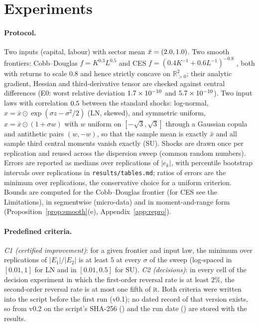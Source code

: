 \documentclass[10pt,a4paper]{article}
\theoremstyle{plain}
\theoremstyle{definition}
\theoremstyle{remark}
\newcommand{\R}{\mathbb{R}}
\begin{document}
\section{Experiments}\label{sec:exp}

\paragraph{Protocol.} Two inputs (capital, labour) with sector mean $\bar x=(2.0,1.0)$. Two smooth frontiers: Cobb--Douglas $f=K^{0.3}L^{0.5}$ \citep{cobbdouglas1928} and CES $f=(0.4K^{-1}+0.6L^{-1})^{-0.8}$ \citep{acms1961}, both with returns to scale $0.8$ and hence strictly concave on $\R^2_{>0}$; their analytic gradient, Hessian and third-derivative tensor are checked against central differences (E0: worst relative deviation $1.7\times 10^{-10}$ and $5.7\times 10^{-10}$). Two input laws with correlation $0.5$ between the standard shocks: log-normal, $x=\bar x\odot\exp(\sigma z-\sigma^2/2)$ (LN, skewed), and symmetric uniform, $x=\bar x\odot(1+\sigma w)$ with $w$ uniform on $[-\sqrt3,\sqrt3]$ through a Gaussian copula and antithetic pairs $(w,-w)$, so that the sample mean is exactly $\bar x$ and all sample third central moments vanish exactly (SU). Shocks are drawn once per replication and reused across the dispersion sweep (common random numbers). Errors are reported as medians over replications of $|e_k|$, with percentile bootstrap intervals over replications in \texttt{results/tables.md}; ratios of errors are the minimum over replications, the conservative choice for a uniform criterion. Bounds are computed for the Cobb--Douglas frontier (for CES see the Limitations), in segmentwise (micro-data) and in moment-and-range form (Proposition~\ref{prop:smooth}(e), Appendix~\ref{app:repro}).

\paragraph{Predefined criteria.} \emph{C1 (certified improvement)}: for a given frontier and input law, the minimum over replications of $|E_1|/|E_2|$ is at least $5$ at every $\sigma$ of the sweep (log-spaced in $[0.01,1]$ for LN and in $[0.01,0.5]$ for SU). \emph{C2 (decisions)}: in every cell of the decision experiment in which the first-order reversal rate is at least $2\%$, the second-order reversal rate is at most one fifth of it. Both criteria were written into the script before the first run (v0.1); no dated record of that version exists, so from v0.2 on the script's SHA-256 (\MetaScriptSha) and the run date (\MetaDate) are stored with the results.
\end{document}
